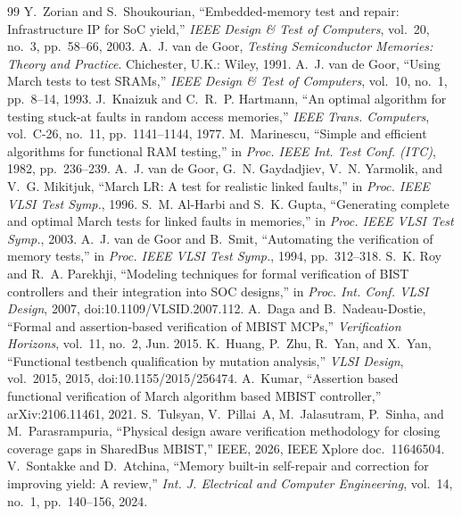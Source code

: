 \documentclass[conference]{IEEEtran}
\begin{document}
\begin{thebibliography}{99}
 Y.~Zorian and S.~Shoukourian, ``Embedded-memory test and repair: Infrastructure IP for SoC yield,'' \emph{IEEE Design \& Test of Computers}, vol.~20, no.~3, pp.~58--66, 2003.
 A.~J. van de Goor, \emph{Testing Semiconductor Memories: Theory and Practice}. Chichester, U.K.: Wiley, 1991.
 A.~J. van de Goor, ``Using March tests to test SRAMs,'' \emph{IEEE Design \& Test of Computers}, vol.~10, no.~1, pp.~8--14, 1993.
 J.~Knaizuk and C.~R.~P. Hartmann, ``An optimal algorithm for testing stuck-at faults in random access memories,'' \emph{IEEE Trans. Computers}, vol.~C-26, no.~11, pp.~1141--1144, 1977.
 M.~Marinescu, ``Simple and efficient algorithms for functional RAM testing,'' in \emph{Proc. IEEE Int. Test Conf. (ITC)}, 1982, pp.~236--239.
 A.~J. van de Goor, G.~N. Gaydadjiev, V.~N. Yarmolik, and V.~G. Mikitjuk, ``March LR: A test for realistic linked faults,'' in \emph{Proc. IEEE VLSI Test Symp.}, 1996.
 S.~M. Al-Harbi and S.~K. Gupta, ``Generating complete and optimal March tests for linked faults in memories,'' in \emph{Proc. IEEE VLSI Test Symp.}, 2003.
 A.~J. van de Goor and B.~Smit, ``Automating the verification of memory tests,'' in \emph{Proc. IEEE VLSI Test Symp.}, 1994, pp.~312--318.
 S.~K. Roy and R.~A. Parekhji, ``Modeling techniques for formal verification of BIST controllers and their integration into SOC designs,'' in \emph{Proc. Int. Conf. VLSI Design}, 2007, doi:10.1109/VLSID.2007.112.
 A.~Daga and B.~Nadeau-Dostie, ``Formal and assertion-based verification of MBIST MCPs,'' \emph{Verification Horizons}, vol.~11, no.~2, Jun. 2015.
 K.~Huang, P.~Zhu, R.~Yan, and X.~Yan, ``Functional testbench qualification by mutation analysis,'' \emph{VLSI Design}, vol.~2015, 2015, doi:10.1155/2015/256474.
 A.~Kumar, ``Assertion based functional verification of March algorithm based MBIST controller,'' arXiv:2106.11461, 2021.
 S.~Tulsyan, V.~Pillai~A, M.~Jalasutram, P.~Sinha, and M.~Parasrampuria, ``Physical design aware verification methodology for closing coverage gaps in SharedBus MBIST,'' IEEE, 2026, IEEE Xplore doc.~11646504.
 V.~Sontakke and D.~Atchina, ``Memory built-in self-repair and correction for improving yield: A review,'' \emph{Int. J. Electrical and Computer Engineering}, vol.~14, no.~1, pp.~140--156, 2024.

\end{thebibliography}
\end{document}

